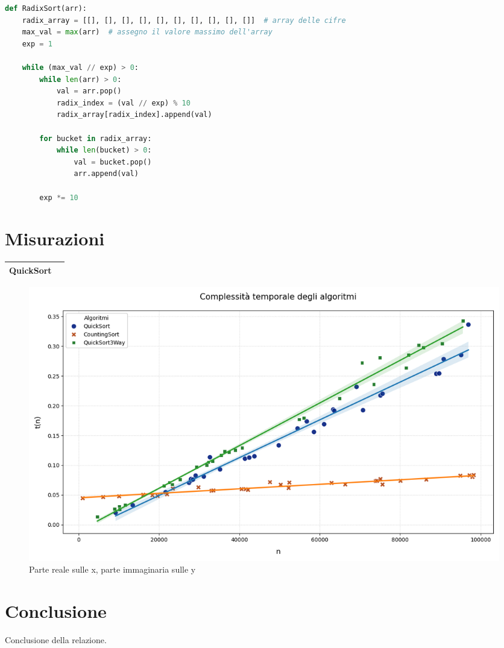 \documentclass[a4paper, 11pt]{article}
\begin{document}
\begin{lstlisting}[style=mycodestyle, language=Python]
def RadixSort(arr):
    radix_array = [[], [], [], [], [], [], [], [], [], []]  # array delle cifre
    max_val = max(arr)  # assegno il valore massimo dell'array
    exp = 1 

    while (max_val // exp) > 0:
        while len(arr) > 0:
            val = arr.pop()
            radix_index = (val // exp) % 10
            radix_array[radix_index].append(val)

        for bucket in radix_array:
            while len(bucket) > 0:
                val = bucket.pop()
                arr.append(val)

        exp *= 10
\end{lstlisting}

\section{Misurazioni}

\begin{table} [H]
    \centering
    \begin{tabular}{|c|c|}
        \hline
        QuickSort \\ [0.1 cm]
        \hline
    \end{tabular}
\end{table}

\begin{figure} [H]
    \centering
    \includegraphics[scale=0.5]{Immagini/Grafico.png}
    \caption*{Parte reale sulle x, parte immaginaria sulle y}
\end{figure}

\section{Conclusione}
Conclusione della relazione.
\end{document}
